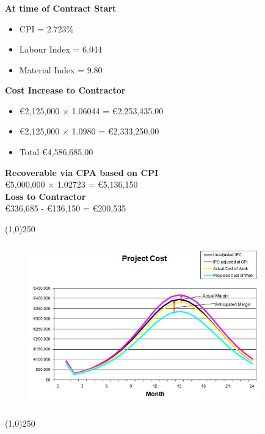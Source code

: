 \begin{frame}
\frametitle{}
\textbf{At time of Contract Start}\\
\begin{itemize}
	\item CPI = 2.723\%
	\item Labour Index = 6.044
	\item Material Index = 9.80
\end{itemize}
%
\textbf{Cost Increase to Contractor}\\
\begin{itemize}
	\item \euro2,125,000 $\times$ 1.06044 = \euro2,253,435.00
	\item \euro2,125,000 $\times$ 1.0980 = 	\euro2,333,250.00
	\item			Total	\euro4,586,685.00
\end{itemize}
\textbf{Recoverable via CPA based on CPI}\\
\euro5,000,000 $\times$ 1.02723 = \euro5,136,150\\
\textbf{Loss to Contractor}\\
\euro336,685 - \euro136,150 = \euro200,535
\end{frame}
\begin{center}\line(1,0){250}\end{center}






\begin{frame}
\frametitle{}
\begin{figure}
	\centering
		\includegraphics[width = 10cm]{images/projmargin.jpg}
	\label{fig:projmargin}
\end{figure}
\end{frame}
\begin{center}\line(1,0){250}\end{center}






